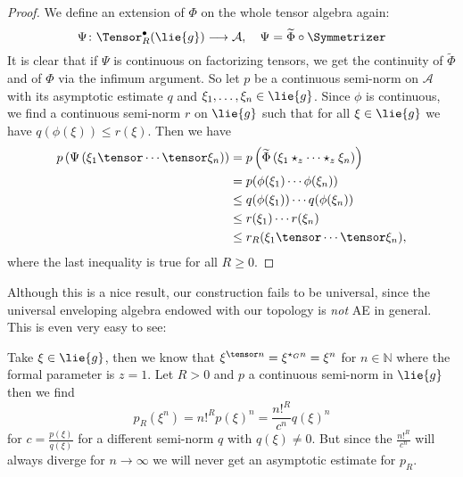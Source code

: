 \begin{proof}
    We define an extension of $\Phi$ on the whole tensor algebra
    again:
    \begin{equation*}
        \Psi \colon
        \Tensor_R^{\bullet}(\lie{g})
        \longrightarrow
        \mathcal{A},
        \quad
        \Psi
        =
        \widetilde{\Phi} \circ \Symmetrizer
    \end{equation*}
    It is clear that if $\Psi$ is continuous on factorizing tensors,
    we get the continuity of $\widetilde{\Phi}$ and of $\Phi$ via the
    infimum argument. So let $p$ be a continuous semi-norm on
    $\mathcal{A}$ with its asymptotic estimate $q$ and $\xi_1, \ldots,
    \xi_n \in \lie{g}$. Since $\phi$ is continuous, we find a
    continuous semi-norm $r$ on $\lie{g}$ such that for all $\xi \in
    \lie{g}$ we have $q(\phi(\xi)) \leq r(\xi)$. Then we have
    \begin{align*}
        p \left(
        \Psi \left(
        \xi_1 \tensor \cdots \tensor \xi_n
        \right) \right)
        & =
        p \left(
        \widetilde{\Phi} \left(
        \xi_1 \star_z \cdots \star_z \xi_n
        \right) \right)
        \\
        & =
        p( \phi(\xi_1) \cdots \phi(\xi_n) )
        \\
        & \leq
        q( \phi(\xi_1) )
        \cdots
        q( \phi(\xi_n) )
        \\
        & \leq
        r(\xi_1) \cdots r(\xi_n)
        \\
        & \leq
        r_R(\xi_1 \tensor \cdots \tensor \xi_n),
    \end{align*}
    where the last inequality is true for all $R \geq 0$.
\end{proof}


Although this is a nice result, our construction fails to be
universal, since the universal enveloping algebra endowed with our
topology is \emph{not} AE in general. This is even very easy to see:
\begin{example}
    Take $\xi \in \lie{g}$, then we know that $\xi^{\tensor n} =
    \xi^{\ostar_G n} = \xi^n$ for $n \in \mathbb{N}$ where the formal
    parameter is $z = 1$. Let $R > 0$ and $p$ a continuous semi-norm
    in $\lie{g}$ then we find
    \begin{equation}
        p_R(\xi^n)
        =
        n!^R p(\xi)^n
        =
        \frac{n!^R}{c^n} q(\xi)^n
    \end{equation}
    for $c = \frac{p(\xi)}{q(\xi)}$ for a different semi-norm $q$ with
    $q(\xi) \neq 0$.  But since the $\frac{n!^R}{c^n}$ will always
    diverge for $n \rightarrow \infty$ we will never get an asymptotic
    estimate for $p_R$.
\end{example}



